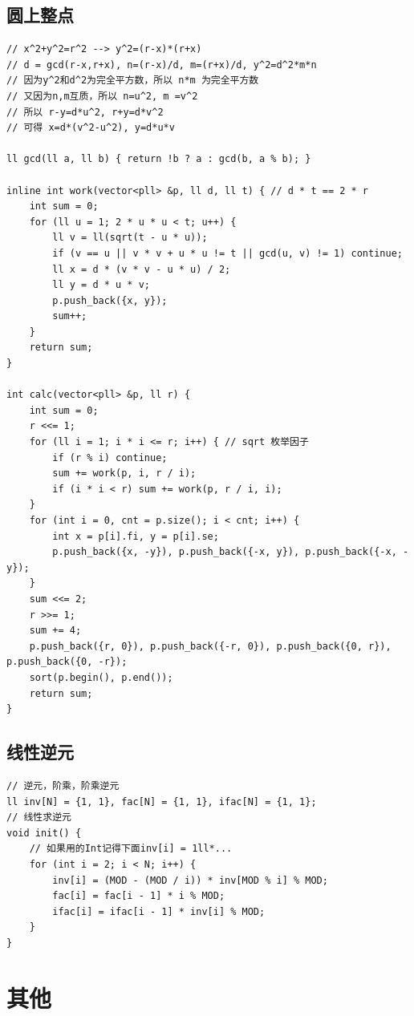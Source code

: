 \documentclass[twoside]{article}
\begin{document}
\subsection{圆上整点}
\begin{lstlisting}
// x^2+y^2=r^2 --> y^2=(r-x)*(r+x)
// d = gcd(r-x,r+x), n=(r-x)/d, m=(r+x)/d, y^2=d^2*m*n
// 因为y^2和d^2为完全平方数，所以 n*m 为完全平方数
// 又因为n,m互质，所以 n=u^2, m =v^2
// 所以 r-y=d*u^2, r+y=d*v^2
// 可得 x=d*(v^2-u^2), y=d*u*v

ll gcd(ll a, ll b) { return !b ? a : gcd(b, a % b); }

inline int work(vector<pll> &p, ll d, ll t) { // d * t == 2 * r
    int sum = 0;
    for (ll u = 1; 2 * u * u < t; u++) {
        ll v = ll(sqrt(t - u * u));
        if (v == u || v * v + u * u != t || gcd(u, v) != 1) continue;
        ll x = d * (v * v - u * u) / 2;
        ll y = d * u * v;
        p.push_back({x, y});
        sum++;
    }
    return sum;
}

int calc(vector<pll> &p, ll r) {
    int sum = 0;
    r <<= 1;
    for (ll i = 1; i * i <= r; i++) { // sqrt 枚举因子
        if (r % i) continue;
        sum += work(p, i, r / i);
        if (i * i < r) sum += work(p, r / i, i);
    }
    for (int i = 0, cnt = p.size(); i < cnt; i++) {
        int x = p[i].fi, y = p[i].se;
        p.push_back({x, -y}), p.push_back({-x, y}), p.push_back({-x, -y});
    }
    sum <<= 2;
    r >>= 1;
    sum += 4;
    p.push_back({r, 0}), p.push_back({-r, 0}), p.push_back({0, r}), p.push_back({0, -r});
    sort(p.begin(), p.end());
    return sum;
}\end{lstlisting}
\subsection{线性逆元}
\begin{lstlisting}
// 逆元，阶乘，阶乘逆元
ll inv[N] = {1, 1}, fac[N] = {1, 1}, ifac[N] = {1, 1};
// 线性求逆元
void init() {
	// 如果用的Int记得下面inv[i] = 1ll*...
    for (int i = 2; i < N; i++) {
        inv[i] = (MOD - (MOD / i)) * inv[MOD % i] % MOD;
        fac[i] = fac[i - 1] * i % MOD;
        ifac[i] = ifac[i - 1] * inv[i] % MOD;
    }
}\end{lstlisting}
\clearpage\section{其他}
\end{document}
